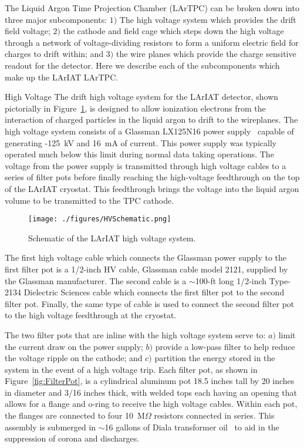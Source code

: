 
The Liquid Argon Time Projection Chamber (LArTPC) can be broken down into three major subcomponents: $1)$ The high voltage system which provides the drift field voltage; $2)$ the cathode and field cage which steps down the high voltage through a network of voltage-dividing resistors to form a uniform electric field for charges to drift within; and $3)$ the wire planes which provide the charge sensitive readout for the detector. Here we describe each of the subcomponents which make up the LArIAT LArTPC.

\begin{subsubsection}{High Voltage}\label{sec:DriftVoltage}
The drift high voltage system for the LArIAT detector, shown pictorially in Figure~\ref{fig:HVScheme}, is designed to allow ionization electrons from the interaction of charged particles in the liquid argon to drift to the wireplanes. The high voltage system consists of a Glassman LX125N16 power supply~\cite{GlassmanPS} capable of generating -125~kV and 16~mA of current. This power supply was typically operated much below this limit during normal data taking operations. The voltage from the power supply is transmitted through high voltage cables to a series of filter pots before finally reaching the high-voltage feedthrough on the top of the LArIAT cryostat. This feedthrough brings the voltage into the liquid argon volume to be transmitted to the TPC cathode.


\begin{figure}[htb]
\centering
\texttt{[image: ./figures/HVSchematic.png]}\\
\caption{Schematic of the LArIAT high voltage system.}
\label{fig:HVScheme}
\end{figure}%

The first high voltage cable which connects the Glassman power supply to the first filter pot is a 1/2-inch HV cable, Glassman cable model 2121, supplied by the Glassman manufacturer. The second cable is a $\sim$100-ft long 1/2-inch Type-2134 Dielectric Sciences cable which connects the first filter pot to the second filter pot. Finally, the same type of cable is used to connect the second filter pot to the high voltage feedthrough at the cryostat.

The two filter pots that are inline with the high voltage system serve to: $a)$ limit the current draw on the power supply; $b)$  provide a low-pass filter to help reduce the voltage ripple on the cathode; and $c)$ partition the energy stored in the system in the event of a high voltage trip. Each filter pot, as shown in Figure~\ref{fig:FilterPot}, is a cylindrical aluminum pot 18.5 inches tall by 20 inches in diameter and 3/16 inches thick, with welded tops each having an opening that allows for a flange and o-ring to receive the high voltage cables. Within each pot, the flanges are connected to four 10~M$\Omega$ resistors connected in series. This assembly is submerged in $\sim$16 gallons of Diala transformer oil~\cite{ShellDiala} to aid in the suppression of corona and discharges.


\end{subsubsection}
